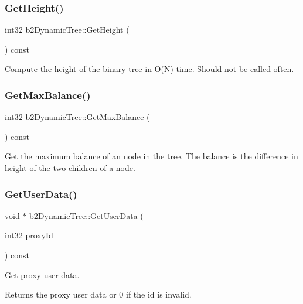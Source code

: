 \subsubsection{\texorpdfstring{Get\+Height()}{GetHeight()}}
{\footnotesize\ttfamily int32 b2\+Dynamic\+Tree\+::\+Get\+Height (\begin{DoxyParamCaption}{ }\end{DoxyParamCaption}) const}

Compute the height of the binary tree in O(\+N) time. Should not be called often. \mbox{\label{classb2_dynamic_tree_a3feab170229e0acd17f6a4ad3fca406e}} 
\subsubsection{\texorpdfstring{Get\+Max\+Balance()}{GetMaxBalance()}}
{\footnotesize\ttfamily int32 b2\+Dynamic\+Tree\+::\+Get\+Max\+Balance (\begin{DoxyParamCaption}{ }\end{DoxyParamCaption}) const}

Get the maximum balance of an node in the tree. The balance is the difference in height of the two children of a node. \mbox{\label{classb2_dynamic_tree_aa8399f9440707780f267696098e8b920}} 
\subsubsection{\texorpdfstring{Get\+User\+Data()}{GetUserData()}}
{\footnotesize\ttfamily void $\ast$ b2\+Dynamic\+Tree\+::\+Get\+User\+Data (\begin{DoxyParamCaption}\item[{int32}]{proxy\+Id }\end{DoxyParamCaption}) const\hspace{0.3cm}{\ttfamily [inline]}}

Get proxy user data. \begin{DoxyReturn}{Returns}
the proxy user data or 0 if the id is invalid. 
\end{DoxyReturn}
\mbox{\label{classb2_dynamic_tree_a7748252811f3c575015931399cbe4daa}} 
